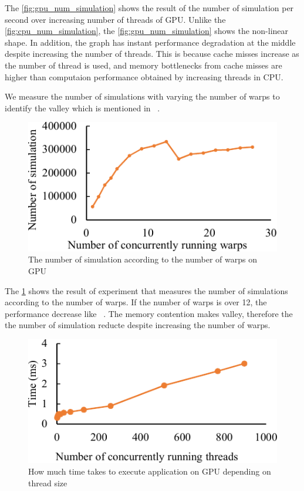 The \cref{fig:gpu_num_simulation} shows the result of the number of simulation per second over increasing number of threads of GPU. 
Unlike the \cref{fig:cpu_num_simulation}, the \cref{fig:gpu_num_simulation} shows the non-linear shape. 
In addition, the graph has instant performance degradation at the middle despite increasing the number of threads. 
This is because cache misses increase as the number of thread is used, and memory bottlenecks from cache misses are higher than computaion performance obtained by increasing threads in CPU.

We measure the number of simulations with varying the number of warps to identify the valley which is mentioned in ~\cite{li2015priority_valley}. 
\begin{figure}
\includegraphics[width=0.95\columnwidth]{figures/gpu_warp_simulation.pdf}
\caption{The number of simulation according to the number of warps on GPU}
\label{fig:gpu_warp_simulation}
\end{figure}

The \cref{fig:gpu_warp_simulation} shows the result of experiment that measures the number of simulations according to the number of warps. 
If the number of warps is over 12, the performance decrease like ~\cite{li2015priority_valley}. 
The memory contention makes valley, therefore the the number of simulation reducte despite increasing the number of warps. 

\begin{figure}
\includegraphics[width=0.95\columnwidth]{figures/gpu_thread_time.pdf}
\caption{How much time takes to execute application on GPU depending on thread size}
\label{fig:gpu_thread_time}
\end{figure}

